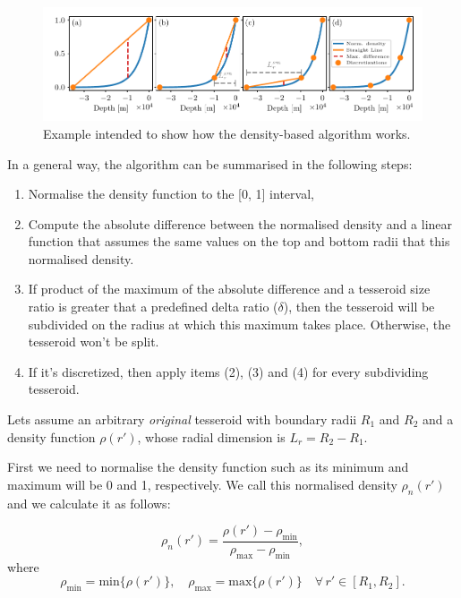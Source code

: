 \documentclass[extra]{gji}
\begin{document}
\begin{figure}
\centering
\includegraphics[width=\linewidth]
    {figures/density-based-discretization-algorithm.pdf}
\caption{
    Example intended to show how the density-based algorithm works.}
\label{fig:density-discretization-algorithm}
\end{figure}

In a general way, the algorithm can be summarised in the following steps:

\begin{enumerate}
\renewcommand{\theenumi}{(\arabic{enumi})}
    \item Normalise the density function to the [0, 1] interval,
    \item Compute the absolute difference between the normalised
          density and a linear function that assumes the same values on the
          top and bottom radii that this normalised density.
    \item If product of the maximum of the absolute difference and a
          tesseroid size ratio is greater that a predefined delta ratio
          ($\delta$), then the tesseroid will be subdivided on the
          radius at which this maximum takes place. Otherwise, the
          tesseroid won't be split.
    \item If it's discretized, then apply items (2), (3) and (4) for
          every subdividing tesseroid.
\end{enumerate}

Lets assume an arbitrary \emph{original} tesseroid with boundary radii
$R_1$ and $R_2$ and a density function $\rho(r')$, whose radial
dimension is $L_r = R_2 - R_1$.

First we need to normalise the density function such as its minimum and
maximum will be 0 and 1, respectively.
We call this normalised density $\rho_n(r')$ and we calculate it as
follows:

\begin{equation}
    \rho_n(r') =
    \frac{\rho(r') - \rho_\text{min}}{\rho_\text{max} - \rho_\text{min}},
\end{equation}
\noindent where
\begin{equation}
    \rho_\text{min} = \text{min}\{ \rho(r') \}, \quad
    \rho_\text{max} = \text{max}\{ \rho(r') \} \quad
    \forall \, r' \in [R_1, R_2].
\end{equation}
\end{document}
